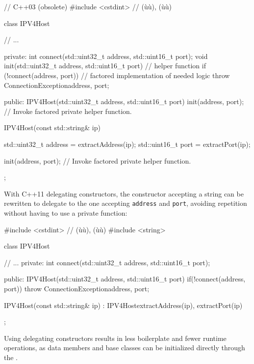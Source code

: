 \begin{emcppslisting}[language=C++]
// C++03 (obsolete)
#include <cstdint>  // (ù{}ù), (ù{}ù)

class IPV4Host
{
    // ...

private:                                                                      
    int connect(std::uint32_t address, std::uint16_t port);
    void init(std::uint32_t address, std::uint16_t port)  // helper function
    {
        if (!connect(address, port))  // factored implementation of needed logic
        {
            throw ConnectionException{address, port};
        }
    }

public:
    IPV4Host(std::uint32_t address, std::uint16_t port)
    {
        init(address, port);  // Invoke factored private helper function.
    }

    IPV4Host(const std::string& ip)
    {
        std::uint32_t address = extractAddress(ip);
        std::uint16_t port = extractPort(ip);

        init(address, port);  // Invoke factored private helper function.
    }
};
\end{emcppslisting}
    
\noindent With C++11 delegating constructors, the constructor accepting a string can be rewritten to
delegate to the one accepting \lstinline!address! and \lstinline!port!,
avoiding repetition without having to use a private function:

\begin{emcppslisting}[language=C++]
#include <cstdint> // (ù{}ù), (ù{}ù)
#include <string>

class IPV4Host
{
     // ...
private:                                                                      
    int connect(std::uint32_t address, std::uint16_t port);

public:
    IPV4Host(std::uint32_t address, std::uint16_t port)
    {
        if(!connect(address, port))
        {
            throw ConnectionException{address, port};
        }
    }

    IPV4Host(const std::string& ip)
        : IPV4Host{extractAddress(ip), extractPort(ip)}
    {
    }
};
\end{emcppslisting}
    
\noindent Using delegating constructors results in less boilerplate and fewer runtime
operations, as data members and base classes can be initialized
directly through the . 


